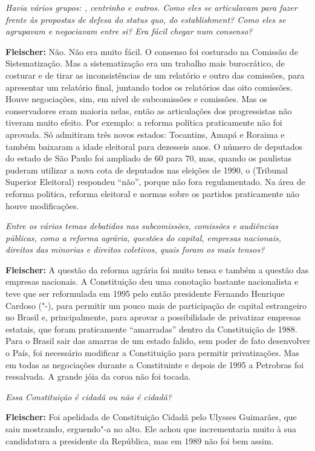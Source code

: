 \emph{Havia vários grupos: , centrinho e outros. Como eles se
articulavam para fazer frente às propostas de defesa do status quo, do
establishment? Como eles se agrupavam e negociavam entre si? Era fácil
chegar num consenso?}

\textbf{Fleischer:} Não. Não era muito fácil. O consenso foi costurado
na Comissão de Sistematização. Mas a sistematização era um trabalho mais
burocrático, de costurar e de tirar as inconsistências de um relatório e
outro das comissões, para apresentar um relatório final, juntando todos
os relatórios das oito comissões. Houve negociações, sim, em nível de
subcomissões e comissões. Mas os conservadores eram maioria nelas, então
as articulações dos progressistas não tiveram muito efeito. Por exemplo:
a reforma política praticamente não foi aprovada. Só admitiram três
novos estados: Tocantins, Amapá e Roraima e também baixaram a idade
eleitoral para dezesseis anos. O número de deputados do estado de São
Paulo foi ampliado de 60 para 70, mas, quando os paulistas puderam
utilizar a nova cota de deputados nas eleições de 1990, o  (Tribunal
Superior Eleitoral) respondeu ``não'', porque não fora regulamentado. Na
área de reforma politica, reforma eleitoral e normas sobre os partidos
praticamente não houve modificações.

\emph{Entre os vários temas debatidos nas subcomissões, comissões e
audiências públicas, como a reforma agrária, questões do capital,
empresas nacionais, direitos das minorias e direitos coletivos, quais
foram os mais tensos?}

\textbf{Fleischer:} A questão da reforma agrária foi muito tensa e
também a questão das empresas nacionais. A Constituição deu uma
conotação bastante nacionalista e teve que ser reformulada em 1995 pelo
então presidente Fernando Henrique Cardoso ("-), para permitir um
pouco mais de participação de capital estrangeiro no Brasil e,
principalmente, para aprovar a possibilidade de privatizar empresas
estatais, que foram praticamente ``amarradas'' dentro da Constituição de
1988. Para o Brasil sair das amarras de um estado falido, sem poder de
fato desenvolver o País, foi necessário modificar a Constituição para
permitir privatizações. Mas em todas as negociações durante a
Constituinte e depois de 1995 a Petrobras foi ressalvada. A grande jóia
da coroa não foi tocada.

\emph{Essa Constituição é cidadã ou não é cidadã?}

\textbf{Fleischer:} Foi apelidada de Constituição Cidadã pelo Ulysses
Guimarães, que saiu mostrando, erguendo"-a no alto. Ele achou que
incrementaria muito à sua candidatura a presidente da República, mas em
1989 não foi bem assim.

